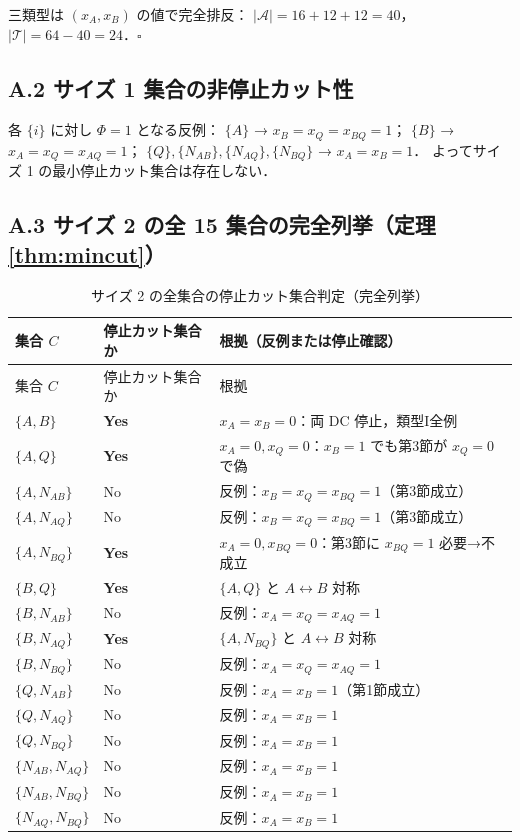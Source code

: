 \documentclass[12pt,a4paper]{article}
\theoremstyle{plain}
\theoremstyle{definition}
\theoremstyle{remark}
\newcommand{\calA}{\mathcal{A}}
\newcommand{\calT}{\mathcal{T}}
\begin{document}
三類型は $(x_A,x_B)$ の値で完全排反：
$|\calA|=16+12+12=40$，$|\calT|=64-40=24$．\hfill$\square$

\subsection*{A.2 サイズ 1 集合の非停止カット性}

各 $\{i\}$ に対し $\Phi=1$ となる反例：
$\{A\}$ → $x_B=x_Q=x_{BQ}=1$；
$\{B\}$ → $x_A=x_Q=x_{AQ}=1$；
$\{Q\},\{N_{AB}\},\{N_{AQ}\},\{N_{BQ}\}$ → $x_A=x_B=1$．
よってサイズ 1 の最小停止カット集合は存在しない．

\subsection*{A.3 サイズ 2 の全 15 集合の完全列挙（定理 \ref{thm:mincut}）}

\begin{longtable}{lll}
  \caption{サイズ 2 の全集合の停止カット集合判定（完全列挙）}
  \label{tab:cutsets_full}\\
  \toprule
  集合 $C$ & 停止カット集合か & 根拠（反例または停止確認） \\
  \midrule
  \endfirsthead
  \toprule
  集合 $C$ & 停止カット集合か & 根拠 \\
  \midrule
  \endhead
  \midrule
  \endfoot
  \bottomrule
  \endlastfoot
  $\{A,B\}$         & \textbf{Yes} & $x_A=x_B=0$：両 DC 停止，類型I全例 \\
  $\{A,Q\}$         & \textbf{Yes} & $x_A=0,x_Q=0$：$x_B=1$ でも第3節が $x_Q=0$ で偽 \\
  $\{A,N_{AB}\}$    & No           & 反例：$x_B=x_Q=x_{BQ}=1$（第3節成立） \\
  $\{A,N_{AQ}\}$    & No           & 反例：$x_B=x_Q=x_{BQ}=1$（第3節成立） \\
  $\{A,N_{BQ}\}$    & \textbf{Yes} & $x_A=0,x_{BQ}=0$：第3節に $x_{BQ}=1$ 必要→不成立 \\
  $\{B,Q\}$         & \textbf{Yes} & $\{A,Q\}$ と $A\leftrightarrow B$ 対称 \\
  $\{B,N_{AB}\}$    & No           & 反例：$x_A=x_Q=x_{AQ}=1$ \\
  $\{B,N_{AQ}\}$    & \textbf{Yes} & $\{A,N_{BQ}\}$ と $A\leftrightarrow B$ 対称 \\
  $\{B,N_{BQ}\}$    & No           & 反例：$x_A=x_Q=x_{AQ}=1$ \\
  $\{Q,N_{AB}\}$    & No           & 反例：$x_A=x_B=1$（第1節成立） \\
  $\{Q,N_{AQ}\}$    & No           & 反例：$x_A=x_B=1$ \\
  $\{Q,N_{BQ}\}$    & No           & 反例：$x_A=x_B=1$ \\
  $\{N_{AB},N_{AQ}\}$ & No         & 反例：$x_A=x_B=1$ \\
  $\{N_{AB},N_{BQ}\}$ & No         & 反例：$x_A=x_B=1$ \\
  $\{N_{AQ},N_{BQ}\}$ & No         & 反例：$x_A=x_B=1$ \\
\end{longtable}
\end{document}

